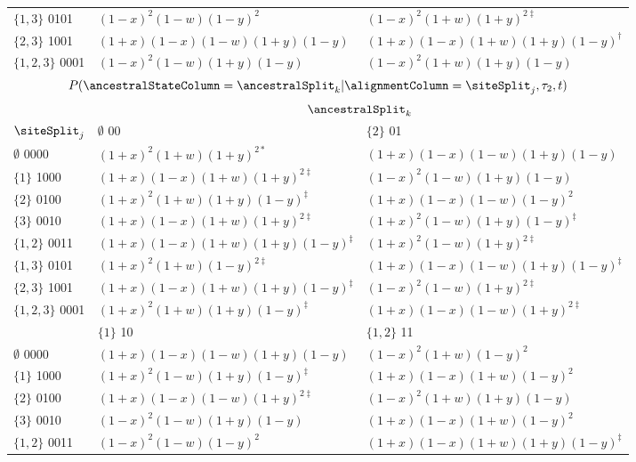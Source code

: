 \begin{table}
\begin{tabular}{|l|ll|}
     $\{1,3\}$     0101&$(1-x)^2   (1-w)(1-y)^2$     &$(1-x)^2   (1+w)(1+y)^{2\ddagger}$\\
     $\{2,3\}$     1001&$(1+x)(1-x)(1-w)(1+y)(1-y)$  &$(1+x)(1-x)(1+w)(1+y)(1-y)^{\dagger}$\\
     $\{1,2,3\}$   0001&$(1-x)^2   (1-w)(1+y)(1-y)$  &$(1-x)^2   (1+w)(1+y)(1-y)$\\
    \hline
\multicolumn{3}{c}{$P(\ancestralStateColumn=\ancestralSplit_k|\alignmentColumn=\siteSplit_j,\tau_2,t)$}\\
\hline
& \multicolumn{2}{|c|}{$\ancestralSplit_k$}\\
    \hline
    $\siteSplit_j$    &$\emptyset$  00                              &$\{2\}$  01\\
    \hline
     $\emptyset$   0000&$(1+x)^2   (1+w)(1+y)^{2*}$           &$(1+x)(1-x)(1-w)(1+y)(1-y)$\\
     $\{1\}$       1000&$(1+x)(1-x)(1+w)(1+y)^{2\ddagger}$    &$(1-x)^2   (1-w)(1+y)(1-y)$\\
     $\{2\}$       0100&$(1+x)^2   (1+w)(1+y)(1-y)^{\ddagger}$&$(1+x)(1-x)(1-w)(1-y)^2$\\
     $\{3\}$       0010&$(1+x)(1-x)(1+w)(1+y)^{2\ddagger}$    &$(1+x)^2   (1-w)(1+y)(1-y)^{\ddagger}$\\
     $\{1,2\}$     0011&$(1+x)(1-x)(1+w)(1+y)(1-y)^{\ddagger}$&$(1+x)^2   (1-w)(1+y)^{2\ddagger}$\\
     $\{1,3\}$     0101&$(1+x)^2   (1+w)(1-y)^{2\ddagger}$    &$(1+x)(1-x)(1-w)(1+y)(1-y)^{\ddagger}$\\
     $\{2,3\}$     1001&$(1+x)(1-x)(1+w)(1+y)(1-y)^{\ddagger}$&$(1-x)^2   (1-w)(1+y)^{2\ddagger}$\\
     $\{1,2,3\}$   0001&$(1+x)^2   (1+w)(1+y)(1-y)^{\ddagger}$&$(1+x)(1-x)(1-w)(1+y)^{2\ddagger}$\\
    \hline
    \hline
    &$\{1\}$  10                           &$\{1,2\}$  11\\
    \hline
     $\emptyset$   0000&$(1+x)(1-x)(1-w)(1+y)(1-y)$             &$(1-x)^2   (1+w)(1-y)^2$\\
     $\{1\}$       1000&$(1+x)^2   (1-w)(1+y)(1-y)^{\ddagger}$  &$(1+x)(1-x)(1+w)(1-y)^2$\\
     $\{2\}$       0100&$(1+x)(1-x)(1-w)(1+y)^{2\ddagger}$      &$(1-x)^2   (1+w)(1+y)(1-y)$\\
     $\{3\}$       0010&$(1-x)^2   (1-w)(1+y)(1-y)$             &$(1+x)(1-x)(1+w)(1-y)^2$\\
     $\{1,2\}$     0011&$(1-x)^2   (1-w)(1-y)^2$                &$(1+x)(1-x)(1+w)(1+y)(1-y)^{\ddagger}$\\

\end{tabular}
\end{table}
